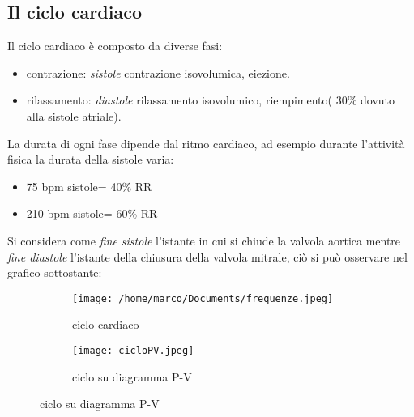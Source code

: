 \documentclass[10pt]{article}
\begin{document}
\subsection{Il ciclo cardiaco}
Il ciclo cardiaco è composto da diverse fasi:
\begin{itemize}
    \item contrazione: \textit{sistole} \textrightarrow  contrazione isovolumica, eiezione. 
    \item rilassamento: \textit{diastole} \textrightarrow  rilassamento isovolumico, riempimento( 30\% dovuto alla sistole atriale).
\end{itemize}
La durata di ogni fase dipende dal ritmo cardiaco, ad esempio durante l'attività fisica la durata della sistole varia:
\begin{itemize}
    \item 75 bpm \textrightarrow sistole= 40\% RR
    \item 210 bpm \textrightarrow sistole= 60\% RR 
\end{itemize}
Si considera come \textit{fine sistole} l'istante in cui si chiude la valvola aortica mentre \textit{fine diastole} l'istante della chiusura della valvola mitrale, ciò si può osservare nel grafico sottostante:


\begin{figure}[h]
\centering
\begin{subfigure}
\centering
\texttt{[image: /home/marco/Documents/frequenze.jpeg]}
\caption{ciclo cardiaco}
\end{subfigure}

\begin{subfigure}
\centering
\texttt{[image: cicloPV.jpeg]}
\caption{ciclo su diagramma P-V}
\end{subfigure}
\end{figure}
\end{document}
